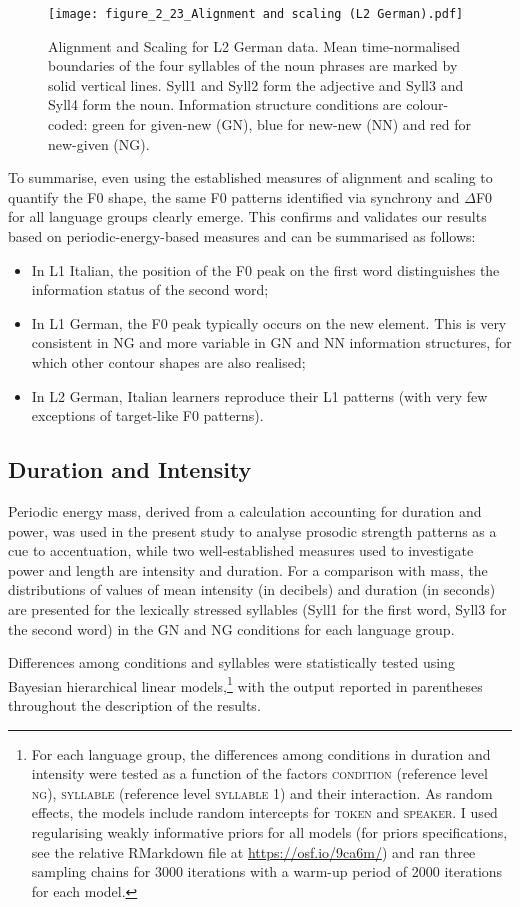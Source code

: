 \begin{figure}
\texttt{[image: figure\_2\_23\_Alignment and scaling (L2 German).pdf]}
\caption{Alignment and Scaling for L2 German data. Mean time-normalised boundaries of the four syllables of the noun phrases are marked by solid vertical lines. Syll1 and Syll2 form the adjective and Syll3 and Syll4 form the noun. Information structure conditions are colour-coded: green for given-new (GN), blue for new-new (NN) and red for new-given (NG).}
\label{fig:2.23}
\end{figure}

To summarise, even using the established measures of alignment and scaling to quantify the F0 shape, the same F0 patterns identified via synchrony and ${\Delta}$F0 for all language groups clearly emerge. This confirms and validates our results based on periodic-energy-based measures and can be summarised as follows:

\begin{itemize}
\item In L1 Italian, the position of the F0 peak on the first word distinguishes the information status of the second word;
\item In L1 German, the F0 peak typically occurs on the new element. This is very consistent in NG and more variable in GN and NN information structures, for which other contour shapes are also realised;
\item In L2 German, Italian learners reproduce their L1 patterns (with very few exceptions of target-like F0 patterns).
\end{itemize}

\subsection{Duration and Intensity}
\label{sec:2.8.3}
Periodic energy mass, derived from a calculation accounting for duration and power, was used in the present study to analyse prosodic strength patterns as a cue to accentuation, while two well-established measures used to investigate power and length are intensity and duration. For a comparison with mass, the distributions of values of mean intensity (in decibels) and duration (in seconds) are presented for the lexically stressed syllables (Syll1 for the first word, Syll3 for the second word) in the GN and NG conditions for each language group.

Differences among conditions and syllables were statistically tested using Bayesian hierarchical linear models,\footnote{For each language group, the differences among conditions in duration and intensity were tested as a function of the factors \textsc{condition} (reference level \textsc{ng}), \textsc{syllable} (reference level \textsc{syllable 1}) and their interaction. As random effects, the models include random intercepts for \textsc{token} and \textsc{speaker}. I used regularising weakly informative priors \citep{Lemoine2019} for all models (for priors specifications, see the relative RMarkdown file at \url{https://osf.io/9ca6m/}) and ran three sampling chains for 3000 iterations with a warm-up period of 2000 iterations for each model.} with the output reported in parentheses throughout the description of the results.

